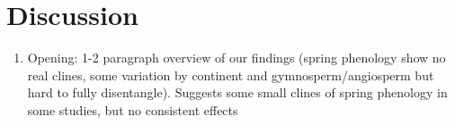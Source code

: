 \documentclass{article}
\begin{document}

\section{Discussion}

\begin{enumerate}
\item Opening: 1-2 paragraph overview of our findings (spring phenology show no real clines, some variation by continent and gymnosperm/angiosperm but hard to fully disentangle). Suggests some small clines of spring phenology in some studies, but no consistent effects 


\end{enumerate}
\end{document}
